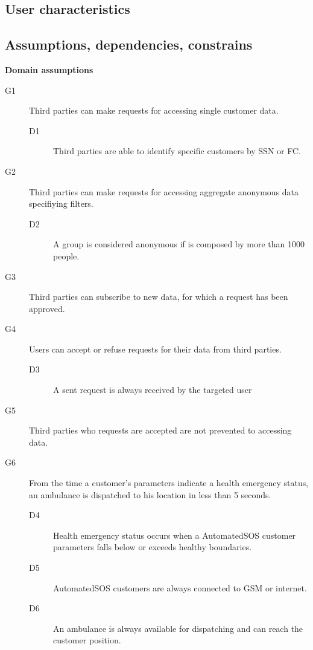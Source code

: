 \documentclass[../main.tex]{subfiles}
\begin{document}
\vspace{8mm}
\subsection{User characteristics}
\subsection{Assumptions, dependencies, constrains}

{\bf Domain assumptions}

\begin{description}

	\item [G1] Third parties can make requests for accessing single customer data.
	\begin{description}
		\item [D1] Third parties are able to identify specific customers by SSN or FC.
	\end{description}

	\item [G2] Third parties can make requests for accessing aggregate anonymous data specifiying filters.
	\begin{description}
		\item [D2] A group is considered anonymous if is composed by more than 1000 people.
	\end{description}

	\item [G3] Third parties can subscribe to new data, for which a request has been approved.
	\begin{description}
		\item
	\end{description}

	\item [G4]  Users can accept or refuse requests for their data from third parties.
	\begin{description}
		\item [D3]  A sent request is always received by the targeted user
	\end{description}

	\item [G5]  Third parties who requests are accepted are not prevented to accessing data.
	\begin{description}
		\item
	\end{description}

	\item [G6]  From the time a customer's parameters indicate a health emergency status, an ambulance is dispatched to his location in less than 5 seconds.
	\begin{description}
		\item [D4] Health emergency status occurs when a AutomatedSOS customer parameters falls below or exceeds healthy boundaries.
		\item [D5] AutomatedSOS customers are always connected to GSM or internet.
		\item [D6] An ambulance is always available for dispatching and can reach the customer position.
	\end{description}


\end{description}
\end{document}
